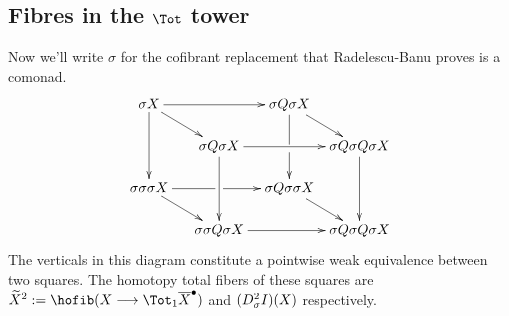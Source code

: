 \documentclass[10pt]{article}
\begin{document}
\begin{convergence}
\subsection{Fibres in the $\Tot$ tower}
Now we'll write $\sigma $ for the cofibrant replacement that Radelescu-Banu proves is a comonad.
\[\def\labelstyle{\scriptstyle}
\xymatrix@!0@R=30pt@C=50pt{
\sigma X \ar[rr]\ar[rd]\ar[dd]         &           &   \sigma Q\sigma X \ar'[d][dd]           \ar[dr]  &                  \\
 &  \sigma Q\sigma X \ar[rr] \ar[dd]  &             & \sigma Q\sigma Q\sigma X
         \ar[dd] \\
\sigma \sigma \sigma X \ar'[r][rr] \ar[dr] &        &   \sigma Q\sigma \sigma X
\ar[dr] &                   \\
           &   \sigma \sigma Q\sigma X \ar[rr]      &                    &
\sigma Q\sigma Q\sigma X
}\]
The verticals in this diagram constitute a pointwise weak equivalence between two squares. The homotopy total fibers of these squares are $\widetilde{X}^2:=\hofib(X\to \Tot_1\overline{X}^\bullet)$ and $(D^{\smash{2}}_{\smash{\sigma}} I)(X)$ respectively.

\end{convergence}
\end{document}
